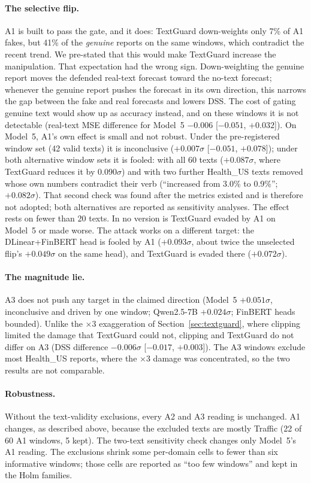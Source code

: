 \paragraph{The selective flip.}
A1 is built to pass the gate, and it does: TextGuard down-weights only 7\% of A1 fakes, but 41\%
of the \emph{genuine} reports on the same windows, which contradict the recent trend. We
pre-stated that this would make TextGuard increase the manipulation. That expectation had the
wrong sign. Down-weighting the genuine report moves the defended real-text forecast toward the
no-text forecast; whenever the genuine report pushes the forecast in its own direction, this
narrows the gap between the fake and real forecasts and lowers DSS. The cost of gating genuine text would show up as accuracy instead, and on these windows
it is not detectable (real-text MSE difference for Model~5 $-0.006$ [$-0.051$, $+0.032$]). On
Model~5, A1's own effect is small and not robust. Under the
pre-registered window set (42 valid texts) it is inconclusive ($+0.007\sigma$
[$-0.051$, $+0.078$]); under both alternative window sets it is fooled: with all 60 texts
($+0.087\sigma$, where TextGuard reduces it by $0.090\sigma$) and with two further Health\_US
texts removed whose own numbers contradict their verb (``increased from 3.0\% to 0.9\%'';
$+0.082\sigma$). That second check was found after the metrics existed and is therefore not
adopted; both alternatives are reported as sensitivity analyses. The effect rests on fewer than
20 texts. In no version is TextGuard evaded by
A1 on Model~5 or made worse. The attack works on a different target: the DLinear+FinBERT head is
fooled by A1 ($+0.093\sigma$, about twice the unselected flip's $+0.049\sigma$ on the same head),
and TextGuard is evaded there ($+0.072\sigma$).

\paragraph{The magnitude lie.}
A3 does not push any target in the claimed direction (Model~5 $+0.051\sigma$, inconclusive and
driven by one window; Qwen2.5-7B $+0.024\sigma$; FinBERT heads bounded). Unlike the $\times 3$
exaggeration of Section~\ref{sec:textguard}, where clipping limited the damage that TextGuard
could not, clipping and TextGuard do not differ on A3 (DSS difference $-0.006\sigma$
[$-0.017$, $+0.003$]). The A3 windows exclude most Health\_US reports, where the $\times 3$
damage was concentrated, so the two results are not comparable.

\paragraph{Robustness.}
Without the text-validity exclusions, every A2 and A3 reading is unchanged. A1 changes, as
described above, because the excluded texts are mostly Traffic (22 of 60 A1 windows, 5 kept).
The two-text sensitivity check changes only Model~5's A1 reading.
The exclusions shrink some per-domain cells to fewer than six informative windows; those cells
are reported as ``too few windows'' and kept in the Holm families.

